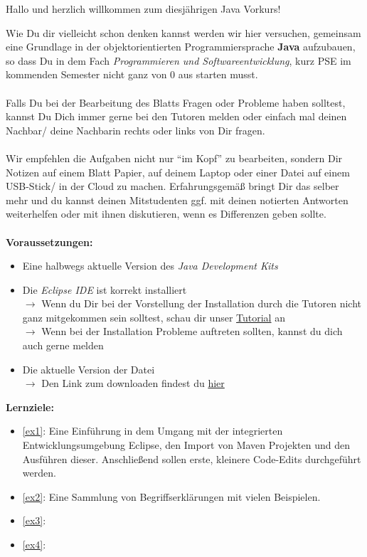 

\begin{center}
	Hallo und herzlich willkommen zum diesjährigen Java Vorkurs!\\
\end{center}
Wie Du dir vielleicht schon denken kannst werden wir hier versuchen, gemeinsam eine Grundlage in der objektorientierten Programmiersprache \textbf{Java} aufzubauen, so dass Du in dem Fach \textit{Programmieren und Softwareentwicklung}, kurz PSE im kommenden Semester nicht ganz von 0 aus starten musst.\\\\
Falls Du bei der Bearbeitung des Blatts Fragen oder Probleme haben solltest, kannst Du Dich immer gerne bei den Tutoren melden oder einfach mal deinen Nachbar/ deine Nachbarin rechts oder links von Dir fragen.\\\\
Wir empfehlen die Aufgaben nicht nur \enquote{im Kopf} zu bearbeiten, sondern Dir Notizen auf einem Blatt Papier, auf deinem Laptop oder einer Datei auf einem USB-Stick/ in der Cloud zu machen. Erfahrungsgemäß bringt Dir das selber mehr und du kannst deinen Mitstudenten ggf. mit deinen notierten Antworten weiterhelfen oder mit ihnen diskutieren, wenn es Differenzen geben sollte.\\\\
\textbf{Voraussetzungen:}
\begin{itemize}
	\item Eine halbwegs aktuelle Version des \textit{Java Development Kits}
	\item Die \textit{Eclipse IDE} ist korrekt installiert\\
	$\rightarrow$ Wenn du Dir bei der Vorstellung der Installation durch die Tutoren nicht ganz mitgekommen sein solltest, schau dir unser \href{https://youtu.be/zxH3G1MTrVs}{Tutorial} an\\
	$\rightarrow$ Wenn bei der Installation Probleme auftreten sollten, kannst du dich auch gerne melden
	\item Die aktuelle Version der \texttt{\jvkpackage} Datei\\
	$\rightarrow$ Den Link zum downloaden findest du \href{\jvkpackageurl}{hier}
\end{itemize}
\textbf{Lernziele:}
\begin{itemize}
	\item \ref{ex1}: Eine Einführung in dem Umgang mit der integrierten Entwicklungsumgebung Eclipse, den Import von Maven Projekten und den Ausführen dieser. Anschließend sollen erste, kleinere Code-Edits durchgeführt werden.
	\item \ref{ex2}: Eine Sammlung von Begriffserklärungen mit vielen Beispielen.
	\item \ref{ex3}:
	\item \ref{ex4}:
\end{itemize}

